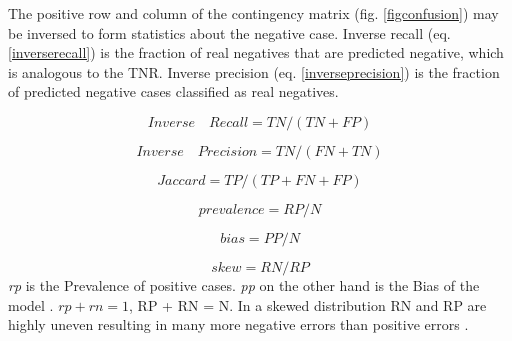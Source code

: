 \documentclass[english,12pt,a4paper,pdftex,elec,utf8, table]{aaltothesis}
\begin{document}
The positive row and column of the contingency matrix (fig. \ref{figconfusion}) may be inversed to form statistics about the negative case. Inverse recall (eq. \ref{inverserecall}) is the fraction of real negatives that are predicted negative, which is analogous to the TNR. Inverse precision (eq. \ref{inverseprecision}) is the fraction of predicted negative cases classified as real negatives. \cite{POWERS2011}

\begin{equation}\label{inverserecall}
Inverse\quad Recall = TN / (TN + FP)
\end{equation}

\begin{equation}\label{inverseprecision}
Inverse\quad Precision = TN / (FN + TN)
\end{equation}

\begin{equation}\label{jaccard}
Jaccard = TP / (TP + FN + FP)
\end{equation}

\begin{equation}\label{prevalence}
prevalence = RP / N
\end{equation}

\begin{equation}\label{bias}
bias = PP / N
\end{equation}

\begin{equation}\label{skew}
skew = RN / RP
\end{equation}
\emph{rp} is the Prevalence of positive cases. \emph{pp} on the other hand is the Bias of the model \cite{lafferty2001conditional}. $rp + rn = 1$, RP + RN = N. In a skewed distribution RN and RP are highly uneven resulting in many more negative errors than positive errors \cite{POWERS2011}.
\end{document}
